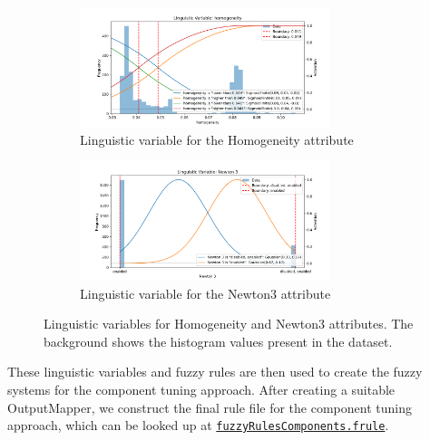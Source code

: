 \begin{figure}[H]
    \centering
    \begin{subfigure}{\columnwidth}
        \centering
        \includegraphics[width=0.8\textwidth,trim={1cm 0 1cm 1.35cm},clip]{figures/DataAnalytics/homogenity_linguistic_variable.png}
        \caption{Linguistic variable for the Homogeneity attribute}
        \label{fig:homogenityLinguisticVariable}
    \end{subfigure}
    \vspace{1cm}
    \begin{subfigure}{\columnwidth}
        \centering
        \includegraphics[width=0.8\textwidth,trim={1cm 0 1cm 1.35cm},clip]{figures/DataAnalytics/newton3_linguistic_variable.png}
        \caption{Linguistic variable for the Newton3 attribute}
        \label{fig:newton3LinguisticVariable_component}
    \end{subfigure}
    \caption{Linguistic variables for Homogeneity and Newton3 attributes. The background shows the histogram values present in the dataset.}
    \label{fig:linguisticVariables}
\end{figure}

\noindent These linguistic variables and fuzzy rules are then used to create the fuzzy systems for the component tuning approach. After creating a suitable OutputMapper, we construct the final rule file for the component tuning approach, which can be looked up at \href{https://github.com/AutoPas/AutoPas/blob/f77f10f72c19a86d5471bce287ae3a4ae344c012/examples/md-flexible/input/fuzzyRulesComponents.frule}{\color{blue}\texttt{fuzzyRulesComponents.frule}}.

